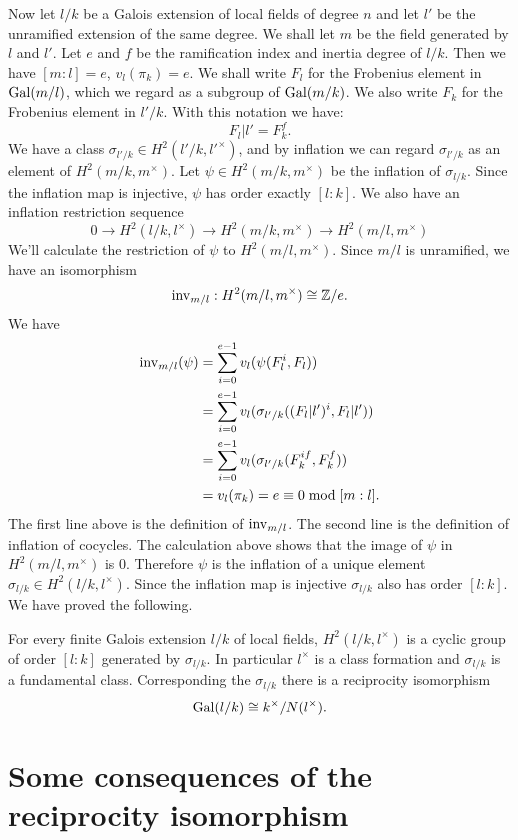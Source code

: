 Now let $l/k$ be a Galois extension of local fields of degree $n$ and let $l'$ be
the unramified extension of the same degree.
We shall let $m$ be the field generated by $l$ and $l'$.
Let $e$ and $f$ be the ramification index and inertia degree of $l/k$.
Then we have $[m:l] = e$, $v_l(\pi_k)= e$.
We shall write $F_l$ for the Frobenius element in $\mathrm{Gal}(m/l)$, which we regard as a subgroup
of $\mathrm{Gal}(m/k)$. We also write $F_k$ for the Frobenius element in $l'/k$.
With this notation we have:
\[
	F_l|l' = F_k^f.
\]
We have a class $\sigma_{l'/k} \in H^2(l'/k,l'^\times)$, and by inflation we can regard
$\sigma_{l'/k}$ as an element of $H^2(m/k,m^\times)$.
Let $\psi\in H^2(m/k,m^\times)$ be the inflation of $\sigma_{l/k}$.
Since the inflation map is injective, $\psi$ has order exactly $[l:k]$.
We also have an inflation restriction sequence
\[
	0 \to H^2(l/k, l^\times) \to H^2(m/k , m^\times) \to H^2(m/l, m^\times)
\]
We'll calculate the restriction of $\psi$ to $H^2(m/l, m^\times)$.
Since $m/l$ is unramified, we have an isomorphism
\[
	\mathrm{inv}_{m/l} : H^2(m/l, m^\times) \cong {\mathbb Z}/ e.
\]
We have
\begin{align*}
	\mathrm{inv}_{m/l}(\psi)
	&=\sum_{i=0}^{e-1} v_l (\psi (F_l^i,F_l))\\
	&=\sum_{i=0}^{e-1} v_l (\sigma_{l'/k}((F_l|l')^i,F_l|l'))\\
	&=\sum_{i=0}^{e-1} v_l (\sigma_{l'/k}(F_k^{if},F_k^f))\\
	&=v_l (\pi_k) = e \equiv 0 \bmod [m:l].
\end{align*}
The first line above is the definition of $\mathrm{inv}_{m/l}$.
The second line is the definition of inflation of cocycles.
The calculation above shows that the image of $\psi$ in $H^2(m/l, m^\times)$ is $0$.
Therefore $\psi$ is the inflation of a unique element $\sigma_{l/k} \in H^2(l/k,l^\times)$.
Since the inflation map is injective $\sigma_{l/k}$ also has order $[l:k]$.
We have proved the following.

\begin{theorem} \label{H2 local cyclic}
	For every finite Galois extension $l/k$ of local fields,
	$H^2(l/k,l^\times)$ is a cyclic group of order $[l:k]$ generated by $\sigma_{l/k}$.
	In particular $l^\times$ is a class formation and $\sigma_{l/k}$ is a fundamental class.
	Corresponding the $\sigma_{l/k}$ there is a reciprocity isomorphism
	\[
		\mathrm{Gal}(l/k) \cong k^\times / N(l^\times).
	\]
\end{theorem}




\section{Some consequences of the reciprocity isomorphism}


